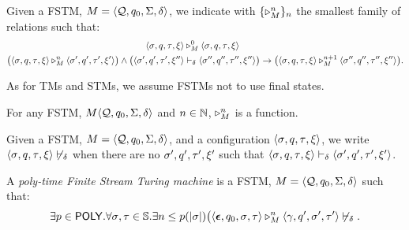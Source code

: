 \begin{defn}\label{df:TMReachability}
Given a FSTM,
$M=\langle \textcolor{black}{\mathcal{Q}}, \textcolor{black}{q_0}, \textcolor{black}{\Sigma}, \textcolor{black}{\delta}\rangle$,
we indicate with $\{\triangleright^n_M\}_n$ the smallest
family of relations such that:
%
%
%
\small
\begin{align*}
\langle \m{\sigma}, \m{q}, \m{\tau}, \m{\xi}\rangle
&\tmreach^0_M
\langle \m{\sigma}, \m{q}, \m{\tau}, \m{\xi}\rangle \\
%
%
\big(\langle \m{\sigma}, \m{q}, \m{\tau}, \m{\xi}\rangle
\tmreach^n_M
\langle \m{\sigma'}, \m{q'}, \m{\tau'}, \m{\xi'}\rangle\big)
%
\wedge
%
\big(\langle \m{\sigma'}, \m{q'}, \m{\tau'}, \m{\xi''}\rangle
%
&\tmstep_{\m{\delta}}
%
\langle \m{\sigma''}, \m{q''}, \m{\tau''}, \m{\xi''}\rangle\big)
\rightarrow
\big(\langle \m{\sigma}, \m{q}, \m{\tau}, \m{\xi}\rangle
\tmreach^{n+1}_M
\langle \m{\sigma''}, \m{q''}, \m{\tau''}, \m{\xi''}\rangle\big).
\end{align*}
\normalsize
\end{defn}
\noindent
As for TMs and STMs,
we assume FSTMs not to use final states.




\begin{prop}
For any FSTM, $M\langle \textcolor{black}{\mathcal{Q}}, \textcolor{black}{q_0}, \textcolor{black}{\Sigma},
\textcolor{black}{\delta}\rangle$ and $n\in \mathbb{N}$,
$\triangleright^n_M$ is a function.
\end{prop}

\begin{notation}
Given a FSTM,
$M=\langle \textcolor{black}{\mathcal{Q}}, \textcolor{black}{q_0}, \textcolor{black}{\Sigma}, \textcolor{black}{\delta}\rangle$,
and a configuration
$\langle \textcolor{black}{\sigma}, \textcolor{black}{q}, \textcolor{black}{\tau}, \textcolor{black}{\xi}\rangle$,
we write
$\langle \textcolor{black}{\sigma}, \textcolor{black}{q}, \textcolor{black}{\tau}, \textcolor{black}{\xi}\rangle \not\vdash_{\textcolor{black}{\delta}}$
when there are no $\textcolor{black}{\sigma'}, \textcolor{black}{q'}, \textcolor{black}{\tau'}, \textcolor{black}{\xi'}$
such that
$\langle \textcolor{black}{\sigma}, \textcolor{black}{q}, \textcolor{black}{\tau}, \textcolor{black}{\xi}\rangle
\vdash_{\textcolor{black}{\delta}} \langle \textcolor{black}{\sigma'}, \textcolor{black}{q'},
\textcolor{black}{\tau'}, \textcolor{black}{\xi'}\rangle$.
\end{notation}
%
%
%



\begin{defn}\label{df:polyTM}
A \emph{poly-time Finite Stream Turing machine}
is a FSTM, $M=\langle \textcolor{black}{\mathcal{Q}}, \textcolor{black}{q_0}, \textcolor{black}{\Sigma},
\textcolor{black}{\delta}\rangle$
such that:
$$
\exists p \in \mathsf{POLY}. \forall \textcolor{black}{\sigma}, \textcolor{black}{\tau} \in \textcolor{black}{\mathbb{S}}.
\exists n \leq p(|\textcolor{black}{\sigma}|)
\big(\langle \textcolor{black}{\bm{\epsilon}}, \textcolor{black}{q_0}, \textcolor{black}{\sigma}, \textcolor{black}{\tau}
\rangle \triangleright^n_M
\langle \textcolor{black}{\gamma}, \textcolor{black}{q'}, \textcolor{black}{\sigma'}, \textcolor{black}{\tau'}\rangle
\not \vdash_\delta.
$$
\end{defn}

